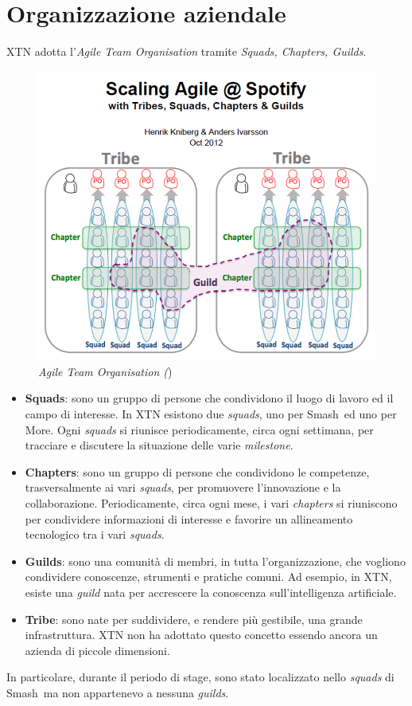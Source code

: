 \section{Organizzazione aziendale}
XTN adotta l'\textit{Agile Team Organisation} tramite \textit{Squads, Chapters, Guilds}.
\begin{figure}[ht]
	\centering
	\includegraphics[scale=0.6]{immagini/agile-org.png}
	\caption{\textit{Agile Team Organisation (})}
\end{figure}
\begin{itemize}
\item{\textbf{Squads}:} sono un gruppo di persone che condividono il luogo di lavoro ed il campo di interesse. In XTN esistono due \textit{squads}, uno per  Smash\textregistered\ ed uno per More\textregistered. Ogni \textit{squads} si riunisce periodicamente, circa ogni settimana, per tracciare e discutere la situazione delle varie \textit{milestone}. 
\item{\textbf{Chapters}:} sono un gruppo di persone che condividono le competenze, trasversalmente ai vari \textit{squads}, per promuovere l'innovazione e la collaborazione. Periodicamente, circa ogni mese, i vari \textit{chapters} si riuniscono per condividere informazioni di interesse e favorire un allineamento tecnologico tra i vari \textit{squads}.
\item{\textbf{Guilds}:} sono una comunità di membri, in tutta l'organizzazione, che vogliono condividere conoscenze, strumenti e pratiche comuni. Ad esempio, in XTN, esiste una \textit{guild} nata per accrescere la conoscenza sull'intelligenza artificiale.
\item{\textbf{Tribe}:} sono nate per suddividere, e rendere più gestibile, una grande infrastruttura. XTN non ha adottato questo concetto essendo ancora un azienda di piccole dimensioni.
\end{itemize}
In particolare, durante il periodo di stage, sono stato localizzato nello \textit{squads} di Smash\textregistered\, ma non appartenevo a nessuna \textit{guilds}.
\newpage

